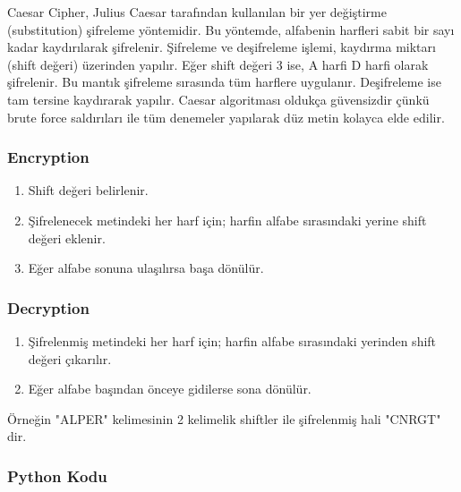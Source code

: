 Caesar Cipher, Julius Caesar tarafından kullanılan bir yer değiştirme (substitution) şifreleme yöntemidir. Bu yöntemde, alfabenin harfleri sabit bir sayı kadar kaydırılarak şifrelenir. Şifreleme ve deşifreleme işlemi, kaydırma miktarı (shift değeri) üzerinden yapılır. Eğer shift değeri 3 ise, A harfi D harfi olarak şifrelenir. Bu mantık şifreleme sırasında tüm harflere uygulanır. Deşifreleme ise tam tersine kaydırarak yapılır. Caesar algoritması oldukça güvensizdir çünkü brute force saldırıları ile tüm denemeler yapılarak düz metin kolayca elde edilir.

\subsubsection{Encryption}

\begin{enumerate}
    \item Shift değeri belirlenir.
    \item Şifrelenecek metindeki her harf için; harfin alfabe sırasındaki yerine shift değeri eklenir.
    \item Eğer alfabe sonuna ulaşılırsa başa dönülür.
\end{enumerate}

\subsubsection{Decryption}

\begin{enumerate}
    \item Şifrelenmiş metindeki her harf için; harfin alfabe sırasındaki yerinden shift değeri çıkarılır.
    \item Eğer alfabe başından önceye gidilerse sona dönülür.
\end{enumerate}

Örneğin "ALPER" kelimesinin 2 kelimelik shiftler ile şifrelenmiş hali "CNRGT" dir.

\subsubsection{Python Kodu}

